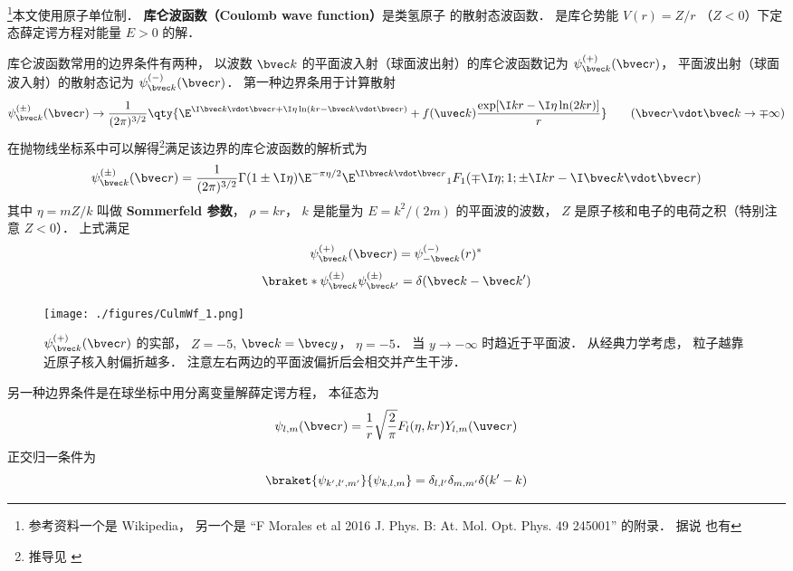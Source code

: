 

\footnote{参考资料一个是 Wikipedia， 另一个是 “F Morales et al 2016 J. Phys. B: At. Mol. Opt. Phys. 49 245001” 的附录． 据说 \cite{Merzbacher} 也有}本文使用原子单位制． \textbf{库仑波函数（Coulomb wave function）}是类氢原子%
的散射态波函数． %
是库仑势能 $V(r) = Z/r$ （$Z < 0$）下定态薛定谔方程对能量 $E > 0$ 的解．

库仑波函数常用的边界条件有两种， 以波数 $\bvec k$ 的平面波入射（球面波出射）的库仑波函数记为 $\psi_{\bvec k}^{(+)}(\bvec r)$， 平面波出射（球面波入射）的散射态记为 $\psi_{\bvec k}^{(-)}(\bvec r)$． 第一种边界条用于计算散射
\begin{equation}\label{CulmWf_eq4}
\psi_{\bvec k}^{(\pm)}(\bvec r) \to \frac{1}{(2\pi)^{3/2}} \qty{\E^{\I\bvec k\vdot\bvec r + \I\eta\ln (kr - \bvec k \vdot\bvec r)}
+ f(\uvec k) \frac{\exp[\I kr - \I\eta \ln(2kr)]}{r}}
\qquad
(\bvec r\vdot \bvec k \to \mp\infty)
\end{equation}
在抛物线坐标系中可以解得\footnote{推导见 \cite{Brandsen}}满足该边界的库仑波函数的解析式为
\begin{equation}
\psi_{\bvec k}^{(\pm)}(\bvec r) = \frac{1}{(2\pi)^{3/2}} \Gamma(1\pm \I\eta)\E^{-\pi\eta/2} \E^{\I\bvec k\vdot\bvec r} {_1F_1}(\mp\I\eta; 1; \pm\I kr - \I \bvec k\vdot \bvec r)
\end{equation}
其中 $\eta = mZ/k$ 叫做 \textbf{Sommerfeld 参数}， $\rho = kr$， $k$ 是能量为 $E = k^2/(2m)$ 的平面波的波数， $Z$ 是原子核和电子的电荷之积（特别注意 $Z < 0$）． 上式满足
\begin{equation}
\psi_{\bvec k}^{(+)}(\bvec r) = \psi_{-\bvec k}^{(-)}(r)^*
\end{equation}
\begin{equation}
\braket*{\psi_{\bvec k}^{(\pm)}}{\psi_{\bvec k'}^{(\pm)}} = \delta(\bvec k - \bvec k')
\end{equation}

\begin{figure}[ht]
\centering
\texttt{[image: ./figures/CulmWf\_1.png]}
\caption{$\psi_{\bvec k}^{(+)}(\bvec r)$ 的实部， $Z = -5$, $\bvec k = \bvec y$， $\eta = -5$． 当 $y \to -\infty$ 时趋近于平面波． 从经典力学考虑， 粒子越靠近原子核入射偏折越多． 注意左右两边的平面波偏折后会相交并产生干涉．} \label{CulmWf_fig2}
\end{figure}

另一种边界条件是在球坐标中用分离变量解薛定谔方程， 本征态为
\begin{equation}
\psi_{l,m}(\bvec r) = \frac{1}{r} \sqrt{\frac{2}{\pi}} F_l(\eta, kr) Y_{l,m}(\uvec r)
\end{equation}
正交归一条件为
\begin{equation}
\braket{\psi_{k', l',m'}}{\psi_{k, l,m}} = \delta_{l,l'}\delta_{m,m'} \delta(k'-k)
\end{equation}

